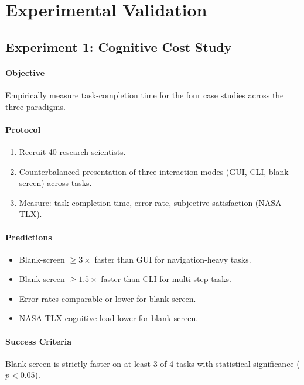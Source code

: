 \documentclass[11pt,a4paper]{article}
\theoremstyle{definition}
\theoremstyle{remark}
\begin{document}
\section{Experimental Validation}
\label{sec:validation}

\subsection{Experiment 1: Cognitive Cost Study}

\paragraph{Objective} Empirically measure task-completion time for the four case studies across the three paradigms.

\paragraph{Protocol}
\begin{enumerate}
    \item Recruit 40 research scientists.
    \item Counterbalanced presentation of three interaction modes (GUI, CLI, blank-screen) across tasks.
    \item Measure: task-completion time, error rate, subjective satisfaction (NASA-TLX).
\end{enumerate}

\paragraph{Predictions}
\begin{itemize}
    \item Blank-screen $\geq 3\times$ faster than GUI for navigation-heavy tasks.
    \item Blank-screen $\geq 1.5\times$ faster than CLI for multi-step tasks.
    \item Error rates comparable or lower for blank-screen.
    \item NASA-TLX cognitive load lower for blank-screen.
\end{itemize}

\paragraph{Success Criteria}
Blank-screen is strictly faster on at least 3 of 4 tasks with statistical significance ($p < 0.05$).
\end{document}
